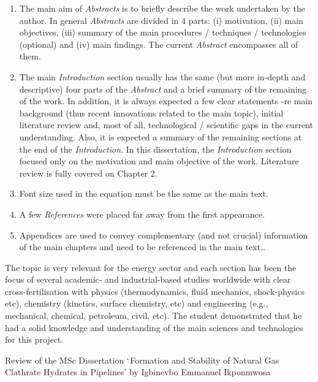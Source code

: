 \documentclass[14pt,twoside]{report}
\begin{document}
\begin{enumerate}
\item The main aim of {\it Abstracts} is to briefly describe the work undertaken by the author. In general {\it Abstracts} are divided in 4 parts: (i) motivation, (ii) main objectives, (iii) summary of the main procedures / techniques / technologies (optional) and (iv) main findings. The current {\it Abstract} encompasses all of them.
%
\item The main {\it Introduction} section usually has the same (but more in-depth and descriptive) four parts of the {\it Abstract} and a brief summary of the remaining of the work. In addition, it is always expected a few clear statements -re main background (thus recent innovations related to the main topic), initial literature review and, most of all, technological / scientific gaps in the current understanding. Also, it is expected a summary of the remaining sections at the end of the {\it Introduction}. In this dissertation, the {\it Introduction} section focused only on the motivation and main objective of the work. Literature review is fully covered on Chapter 2. 
%
\item Font size used in the equation must be the same as the main text.  
%
\item A few {\it References} were placed far away from the first appearance.  
%
\item Appendices are used to convey complementary (and not crucial) information of the main chapters and need to be referenced in the main text..     
% 
\end{enumerate}
The topic is very relevant for the energy sector and each section has been the focus of several academic- and industrial-based studies worldwide with clear cross-fertilisation with physics (thermodynamics, fluid mechanics, shock-physics etc), chemistry (kinetics, surface chemistry, etc) and engineering (e.g., mechanical, chemical, petroleum, civil, etc). The student demonstrated that he had a solid knowledge and understanding of the main sciences and technologies for this project.


\clearpage




\bigskip

\begin{center}
{\Large Review of the MSc Dissertation $\lq$Formation and Stability of Natural Gas Clathrate Hydrates in Pipelines' by Igbinevbo Emmanuel Ikponmwosa}
\end{center}
\end{document}
